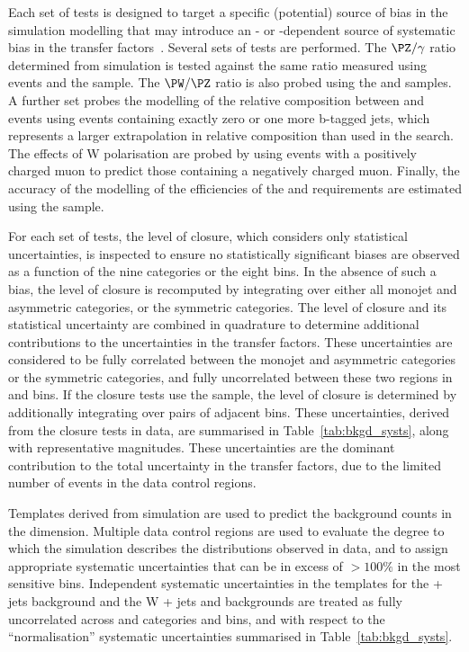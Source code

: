 Each set of tests is designed to target a specific (potential) source
of bias in the simulation modelling that may introduce an \njet- or
\scalht-dependent source of systematic bias in the transfer
factors~\cite{RA1Paper2012}. Several sets of tests are performed. The
$\PZ/\gamma$ ratio determined from simulation is tested against the
same ratio measured using \zmumuj events and the \gj sample. The
$\PW/\PZ$ ratio is also probed using the \mj and \mmj samples. A
further set probes the modelling of the relative composition between
\wlj and \ttbar events using \mj events containing exactly zero or
one more b-tagged jets, which represents a larger extrapolation in
relative composition than used in the search.  The effects of W
polarisation are probed by using \mj events with a positively charged
muon to predict those containing a negatively charged muon. Finally,
the accuracy of the modelling of the efficiencies of the \alphat and
\bdphi requirements are estimated using the \mj sample. 

For each set of tests, the level of closure, which considers only
statistical uncertainties, is inspected to ensure no statistically
significant biases are observed as a function of the nine \njet
categories or the eight \scalht bins. In the absence of such a bias,
the level of closure is recomputed by integrating over either all
monojet and asymmetric \njet categories, or the symmetric \njet
categories. The level of closure and its statistical uncertainty are
combined in quadrature to determine additional contributions to the
uncertainties in the transfer factors. These uncertainties are
considered to be fully correlated between the monojet and asymmetric
\njet categories or the symmetric \njet categories, and fully
uncorrelated between these two regions in \njet and \scalht bins. If
the closure tests use the \mmj sample, the level of closure is
determined by additionally integrating over pairs of adjacent \scalht
bins. These uncertainties, derived from the closure tests in data, are
summarised in Table~\ref{tab:bkgd_systs}, along with representative
magnitudes. These uncertainties are the dominant contribution to the
total uncertainty in the transfer factors, due to the limited number
of events in the data control regions.

Templates derived from simulation are used to predict the background
counts in the \mht dimension. Multiple data control regions are used
to evaluate the degree to which the simulation describes the \mht
distributions observed in data, and to assign appropriate systematic
uncertainties that can be in excess of $>100\%$ in the most sensitive
\mht bins. Independent systematic uncertainties in the templates for
the \znunu + jets background and the W + jets and \ttbar backgrounds
are treated as fully uncorrelated across \njet and \nb categories and
\scalht bins, and with respect to the ``normalisation'' systematic
uncertainties summarised in Table~\ref{tab:bkgd_systs}.

